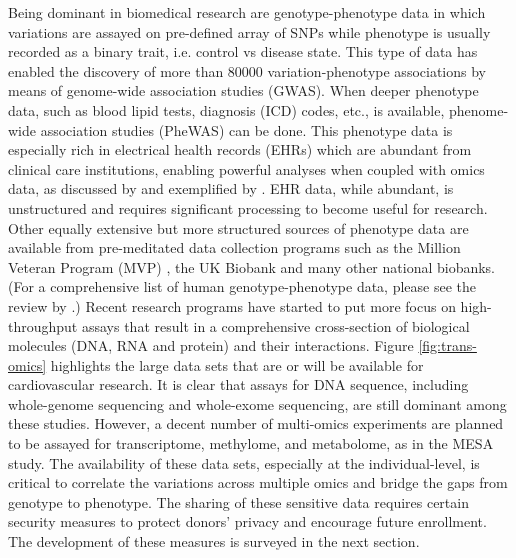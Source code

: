 \documentclass[letter]{bioinfo}
\begin{document}
	Being dominant in biomedical research are genotype-phenotype data in which variations are assayed on pre-defined array of SNPs while phenotype is usually recorded as a binary trait, i.e. control vs disease state. This type of data has enabled the discovery of more than 80000 variation-phenotype associations by means of genome-wide association studies (GWAS).
	When deeper phenotype data, such as blood lipid tests, diagnosis (ICD) codes, etc., is available, phenome-wide association studies (PheWAS) can be done. This phenotype data is especially rich in electrical health records (EHRs) which are abundant from clinical care institutions, enabling powerful analyses when coupled with omics data, as discussed by \cite{Denaxas:2015:Big, Wu:2017:Omic} and exemplified by  \cite{Dewey:2016:Distribution,Li:2018:Decoding}.
	EHR data, while abundant, is unstructured and requires significant processing to become useful for research. Other equally  extensive but more structured sources of phenotype data are available from pre-meditated data collection programs such as the Million Veteran Program (MVP) \citep{Gaziano:2016:Million}, the UK Biobank \citep{Collins:2012:Biobank} and many other national biobanks. (For a comprehensive list of human genotype-phenotype data, please see the review by \cite{Brookes:2015:Human}.)
	Recent research programs have started to put more focus on high-throughput assays that result in a comprehensive cross-section of biological molecules (DNA, RNA and protein) and their interactions.  Figure \ref{fig:trans-omics} highlights the large data sets that are or will be available for cardiovascular research. It is clear that assays for DNA sequence, including whole-genome sequencing and whole-exome sequencing, are still dominant among these studies. However, a decent number of multi-omics experiments are planned to be assayed for transcriptome, methylome, and metabolome, as in the MESA study. The availability of these data sets, especially at the individual-level, is critical to correlate the variations across multiple omics and bridge the gaps from genotype to phenotype. The sharing of these sensitive data requires certain security measures to protect donors' privacy and encourage future enrollment. The development of these measures is surveyed in the next section.
	
\end{document}
